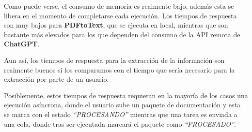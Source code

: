 Como puede verse, el consumo de memoria es realmente bajo, además esta se libera en el momento de completarse cada
ejecución.
Los tiempos de respuesta son muy bajos para \textbf{PDFtoText}, que se ejecuta en local, mientras que son bastante
más elevados para los que dependen del consumo de la API remota de \textbf{ChatGPT}.

Aun así, los tiempos de respuesta para la extracción de la información son realmente buenos si los comparamos con el
tiempo que sería necesario para la extracción por parte de un usuario.

Posiblemente, estos tiempos de respuesta requieran en la mayoría de los casos una ejecución asíncrona, donde el usuario
sube un paquete de documentación y esta se marca con el estado \textit{``PROCESANDO''} mientras que una tarea es
enviada a una cola, donde tras ser ejecutada marcará el paquete como \textit{``PROCESADO''}.

